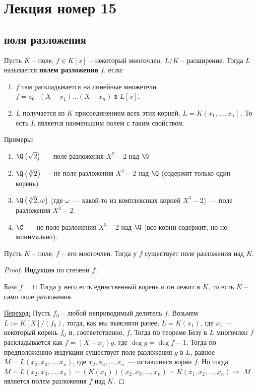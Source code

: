 \usepackage{amsmath}\section{Лекция номер 15}
\subsection{поля разложения}

\begin{conj}
    Пусть $K$ -- поле, $f \in K[x]$ -- некоторый многочлен, $L/K$ -- расширение. Тогда $L$ называется \textbf{полем разложения} $f$, если:
    \begin{enumerate}
        \item $f$ там раскладывается на линейные множетели. $f = a_0 \cdot (X - x_1) \dots (X - x_n)$ в $L[x]$. 
        \item $L$ получается из $K$ присоединением всех этих корней. $L = K(x_1, \dots, x_n)$. То есть $L$ является наименьшим полем с таким свойством. 
    \end{enumerate}
\end{conj}
Примеры:
\begin{enumerate}
    \item $\Q\left(\sqrt 2\right)$~--- поле разложения $X^2-2$ над $\Q$
    \item $\Q\left(\sqrt[3]{2}\right)$~--- не поле разложения $X^3-2$ над $\Q$ (содержит только один корень)
    \item $\Q\left(\sqrt[3]{2}, \omega\right)$ (где $\omega$~--- какой-то из комплексных корней $X^3-2$)~--- поле разложения $X^3-2$.
    \item $\C$~--- не поле разложения $X^3-2$ над $\Q$ (все корни содержит, но не минимально).
\end{enumerate}

\begin{theorem}
    Пусть $K$ -- поле, $f$ -- его многочлен. Тогда у $f$ существует поле разложения над $K$. 
\end{theorem}
\begin{proof}
    Индукция по степени $f$. 

    \quad \underline{База $f = 1$:} Тогда у него есть единственный корень и он лежит в $K$, то есть $K$ -- само поле разложения. 

    \quad \underline{Переход:} Пусть $f_0$ -- любой неприводимый делитель $f$.
    Возьмем $L := K[X] / (f_0)$, тогда, как мы выясняли ранее, $L=K(x_1)$, где $x_1$~--- некоторый корень $f_0$ и, соответственно, $f$.
    Тогда по теореме Безу в $L$ многочлен $f$ раскладывается как $f=(X-x_1)g$, где $\deg g = \deg f - 1$.
    Тогда по предположению индукции существует поле разложения $g$ в $L$, равное $M=L(x_2, x_3, \ldots, x_n)$, где $x_2,x_3,\ldots, x_n$~--- оставшиеся корни $f$.
    Но тогда $M=L(x_2, x_3, \ldots, x_n) = (K(x_1))(x_2, x_3, \ldots, x_n) = K(x_1, x_2, \ldots, x_n) \Rightarrow$ $M$ является полем разложения $f$ над $K$.
\end{proof}

